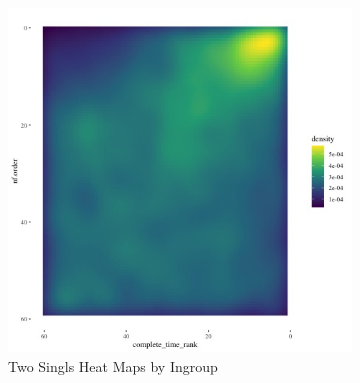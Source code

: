 \documentclass[12pt,letterpaper]{article}
\begin{document}

\begin{figure}[ht]

    \begin{subfigure}{.5\textwidth} %
        \centering
        \includegraphics[width=.9\linewidth]{Output/Graphs/Audit/Heatmaps/US NF chron rank by nf rank - smooth.jpg}  %
        \caption{Two Singls Heat Maps by Ingroup}
        \label{fig:sub-first}
        \end{subfigure}
    \begin{subfigure}{.5\textwidth}
        \centering

\end{subfigure}
\end{figure}
\end{document}
